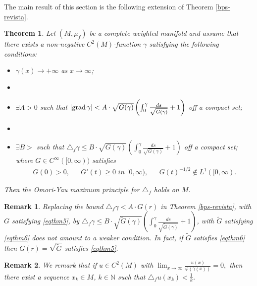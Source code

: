 \documentclass[a4paper]{amsart}
\newtheorem{theorem}{Theorem}
\newtheorem{remark}{Remark}
\begin{document}
The main result of this section is the following  extension of Theorem \ref{bps-revista}.

\begin{theorem}Let $(M,\mu_{f})$ be a complete weighted manifold and assume that there exists a non-negative $C^{2}(M)$-function $\gamma$ satisfying the following conditions:
\begin{itemize}\item[a.] $\gamma (x)\to + \infty$ as $x\to \infty$;
\item[]
\item[b.]$\exists A>0$ such that  $\vert {{{\rm{grad}\,}}} \gamma \vert <A \cdot \sqrt{G(\gamma)}\left(\int_{0}^{\gamma}\frac{ds}{\sqrt{G(\gamma)}}+1\right) $ off a compact set;
\item[]
\item[c.]$\exists B>$ such that $\triangle_{f} \gamma \leq B \cdot \sqrt{G(\gamma)}\left(\int_{0}^{\gamma}\frac{ds}{\sqrt{G(\gamma)}}+1\right) $ off a compact set; \\
where $G\in C^{\infty}([0, \infty))$ satisfies 
\begin{equation}\label{eqthm6}
\begin{array}{lllll} G(0)>0,&& G'(t)\geq 0 \,\, in\,\, [0, \infty),&& G(t)^{-1/2}\not \in L^{1}([0, \infty).\end{array}\end{equation}
\end{itemize}Then the Omori-Yau maximum principle for $\triangle_{f}$ holds on $M$.
\end{theorem}

\begin{remark}Replacing the bound $\triangle_{f} \gamma <A\cdot  G(r)$ in Theorem \ref{bps-revista}, with  $G$ satisfying \eqref{eqthm5},   by $\triangle_{f} \gamma \leq B \cdot \sqrt{\tilde{G}(\gamma)}\left(\int_{0}^{\gamma}\frac{ds}{\sqrt{\tilde{G}(\gamma)}}+1\right) $, with $\tilde{G}$ satisfying  \eqref{eqthm6} does not amount to a weaker condition. In fact, if $\tilde{G}$ satisfies \eqref{eqthm6} then $G(r)= \sqrt{\tilde{G}}$ satisfies \eqref{eqthm5}.
\end{remark}

\begin{remark}We remark that   if $u\in C^{2}(M)$ with $
\displaystyle{\lim_{x \to \infty}\frac{u(x)}{\varphi(\gamma(x))}} = 0 ,
$ then there exist a sequence ${x_{k}} \in M$, $k \in \mathbb{N} $ such that
$ \displaystyle{\triangle_{f} u(x_{k}) < \frac{1}{k}} $.
\end{remark}
\end{document}
